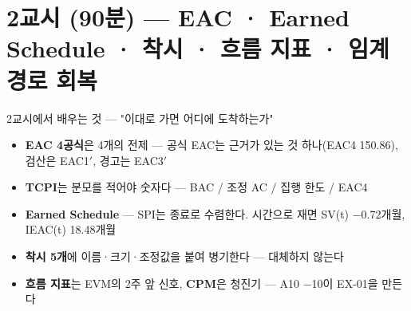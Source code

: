 \section{2교시 (90분) — EAC · Earned Schedule · 착시 · 흐름 지표 · 임계경로 회복}

\begin{frame}{2교시에서 배우는 것 — "이대로 가면 어디에 도착하는가"}
\begin{itemize}
\item \textbf{EAC 4공식}은 4개의 전제 — 공식 EAC는 근거가 있는 것 하나(EAC4 150.86), 검산은 EAC1$'$, 경고는 EAC3$'$
\item \textbf{TCPI}는 분모를 적어야 숫자다 — BAC / 조정 AC / 집행 한도 / EAC4
\item \textbf{Earned Schedule} — SPI는 종료로 수렴한다. 시간으로 재면 SV(t) $-$0.72개월, IEAC(t) 18.48개월
\item \textbf{착시 5개}에 이름·크기·조정값을 붙여 병기한다 — 대체하지 않는다
\item \textbf{흐름 지표}는 EVM의 2주 앞 신호, \textbf{CPM}은 청진기 — A10 $-$10이 EX-01을 만든다
\end{itemize}
\end{frame}


